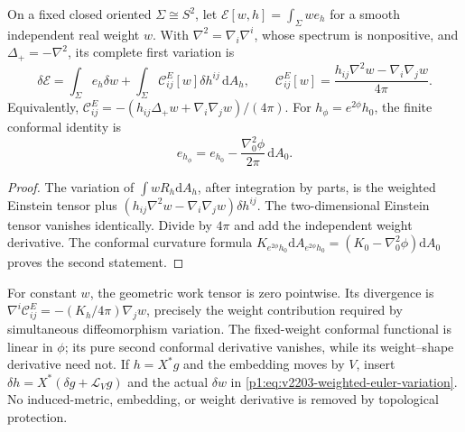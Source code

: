 \documentclass[11pt]{article}
\begin{document}
\begin{theorem}
\label{p1:thm:v2203-weighted-euler-work}
On a fixed closed oriented \(\Sigma\cong S^2\), let
\(\mathcal E[w,h]=\int_\Sigma we_h\) for a smooth independent real weight
\(w\). With \(\nabla^2=\nabla_i\nabla^i\), whose spectrum is nonpositive,
and \(\Delta_+=-\nabla^2\), its complete first variation is
\begin{equation}
\label{p1:eq:v2203-weighted-euler-variation}
 \boxed{\delta\mathcal E
 =\int_\Sigma e_h\delta w
 +\int_\Sigma\mathcal C^E_{ij}[w]\delta h^{ij}\,\mathrm dA_h,
 \qquad
 \mathcal C^E_{ij}[w]
 =\frac{h_{ij}\nabla^2w-\nabla_i\nabla_jw}{4\pi}.}
\end{equation}
Equivalently,
\(\mathcal C^E_{ij}=-(h_{ij}\Delta_+w+\nabla_i\nabla_jw)/(4\pi)\).
For \(h_\phi=e^{2\phi}h_0\), the finite conformal identity is
\begin{equation}
\label{p1:eq:v2203-conformal-euler}
 e_{h_\phi}=e_{h_0}-\frac{\nabla_0^2\phi}{2\pi}\,\mathrm dA_0.
\end{equation}
\end{theorem}
\begin{proof}
The variation of \(\int wR_h\mathrm dA_h\), after integration by parts,
is the weighted Einstein tensor plus
\((h_{ij}\nabla^2w-\nabla_i\nabla_jw)\delta h^{ij}\).
The two-dimensional Einstein tensor vanishes identically. Divide by
\(4\pi\) and add the independent weight derivative. The conformal
curvature formula
\(K_{e^{2\phi}h_0}\mathrm dA_{e^{2\phi}h_0}
=(K_0-\nabla_0^2\phi)\mathrm dA_0\)
proves the second statement.
\end{proof}
For constant \(w\), the geometric work tensor is zero pointwise.
Its divergence is
\(\nabla^i\mathcal C^E_{ij}=-(K_h/4\pi)\nabla_jw\), precisely the
weight contribution required by simultaneous diffeomorphism variation.
The fixed-weight conformal functional is linear in \(\phi\); its pure
second conformal derivative vanishes, while its weight--shape derivative
need not. If \(h=X^*g\) and the embedding moves by \(V\), insert
\(\delta h=X^*(\delta g+\mathcal L_Vg)\) and the actual \(\delta w\)
in \eqref{p1:eq:v2203-weighted-euler-variation}. No induced-metric,
embedding, or weight derivative is removed by topological protection.
\end{document}
